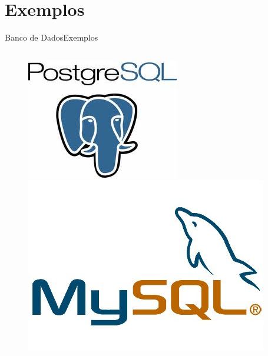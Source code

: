 \documentclass{beamer}
\begin{document}
\section{Exemplos}
\begin{frame}[fragile]{Banco de Dados}{Exemplos}
	\begin{columns}
		\begin{column}{0.5\textwidth}
			\begin{figure}
				\begin{minipage}{\columnwidth}
					\includegraphics[scale=0.5]{images/pg}
				\end{minipage}
				\begin{minipage}{\columnwidth}
					\includegraphics[scale=1]{images/mysql}
				\end{minipage}
			\end{figure}
		\end{column}
	

\end{columns}
\end{frame}
\end{document}
